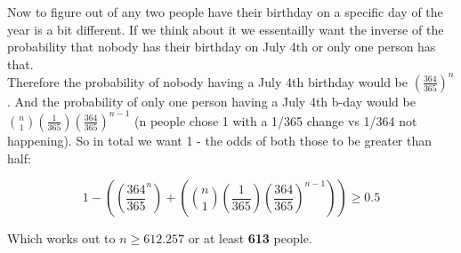 \documentclass{article}
\begin{document}
\begin{enumerate}
        Now to figure out of any two people have their birthday on a specific day of the year is a bit different. 
        If we think about it we essentailly want the inverse of the probability that nobody has their birthday on July 4th or only one person has that.\\

        Therefore the probability of nobody having a July 4th birthday would be $(\frac{364}{365})^n$. 
        And the probability of only one person having a July 4th b-day would be $\binom{n}{1}(\frac{1}{365})(\frac{364}{365})^{n-1}$ (n people chose 1 with a 1/365 change vs 1/364 not happening).
        So in total we want 1 - the odds of both those to be greater than half:

        \[1 - ((\frac{364}{365}^n)+(\binom{n}{1}(\frac{1}{365})(\frac{364}{365})^{n-1})) \geq 0.5\]

        Which works out to $n \geq 612.257$ or at least \textbf{613} people. 








  \end{enumerate}
\end{document}
